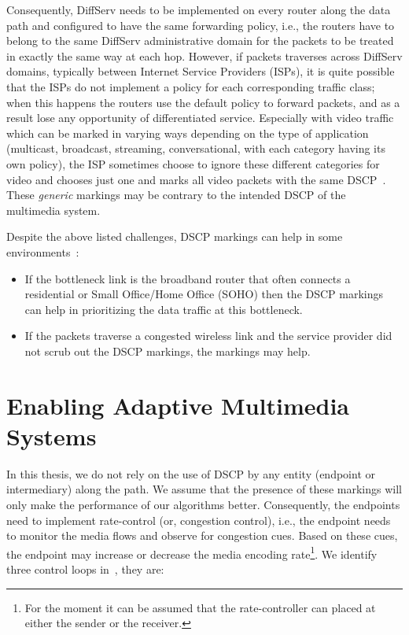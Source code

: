 Consequently, DiffServ needs to be implemented on every router along the data
path and configured to have the same forwarding policy, i.e., the routers have
to belong to the same DiffServ administrative domain for the packets to be
treated in exactly the same way at each hop. However, if packets traverses
across DiffServ domains, typically between Internet Service Providers (ISPs),
it is quite possible that the ISPs do not implement a policy for each
corresponding traffic class; when this happens the routers use the default
policy to forward packets, and as a result lose any opportunity of
differentiated service. Especially with video traffic which can be marked in
varying ways depending on the type of application (multicast, broadcast,
streaming, conversational, with each category having its own policy), the ISP
sometimes choose to ignore these different categories for video and chooses
just one and marks all video packets with the same DSCP~\cite{rfc5865}. These
\emph{generic} markings may be contrary to the intended DSCP of the multimedia
system.



Despite the above listed challenges, DSCP markings can help in some
environments~\cite{draft.rtcweb.qos}:

\begin{itemize}
	
    \item If the bottleneck link is the broadband router that often connects a
    residential or Small Office/Home Office (SOHO) then the DSCP markings can 
    help in prioritizing the data traffic at this bottleneck.

	\item If the packets traverse a congested wireless link and the service 
	provider did not scrub out the DSCP markings, the markings may help.

\end{itemize}

\section{Enabling Adaptive Multimedia Systems}
\label{rg.title}

In this thesis, we do not rely on the use of DSCP by any entity (endpoint or
intermediary) along the path. We assume that the presence of these markings
will only make the performance of our algorithms better. Consequently, the
endpoints need to implement rate-control (or, congestion control), i.e., the
endpoint needs to monitor the media flows and observe for congestion cues.
Based on these cues, the endpoint may increase or decrease the media encoding
rate\footnote{For the moment it can be assumed that the rate-controller can
placed at either the sender or the receiver.}. We identify three control loops
in~\cite{Singh:control.loops.api}, they are:

